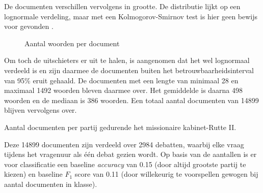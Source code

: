 De documenten verschillen vervolgens in grootte. De distributie lijkt op een lognormale verdeling, maar met een Kolmogorov-Smirnov test is hier geen bewijs voor gevonden \cite{Scipy}.

\begin{figure}[H]
    \centering
    \hspace*{-1in}
    \caption{Aantal woorden per document}%
    \label{fig:example}%
\end{figure}
Om toch de uitschieters er uit te halen, is aangenomen dat het wel lognormaal verdeeld is en zijn daarmee de documenten buiten het betrouwbaarheidsinterval van 95\% eruit gehaald. De documenten met een lengte van minimaal 28 en maximaal 1492 woorden bleven daarmee over. Het gemiddelde is daarna 498 woorden en de mediaan is 386 woorden. Een totaal aantal documenten van 14899 blijven vervolgens over.\par

\begin{table}[H]
\label{aantallen}
\caption{Aantal documenten per partij gedurende het missionaire kabinet-Rutte II.}
\centering

\end{table}
Deze 14899 documenten zijn verdeeld over 2984 debatten, waarbij elke vraag tijdens het vragenuur als één debat gezien wordt. Op basis van de aantallen is er voor classificatie een baseline \textit{accuracy} van 0.15 (door altijd grootste partij te kiezen) en baseline $F_1$ score van 0.11 (door willekeurig te voorspellen gewogen bij aantal documenten in klasse).\par


